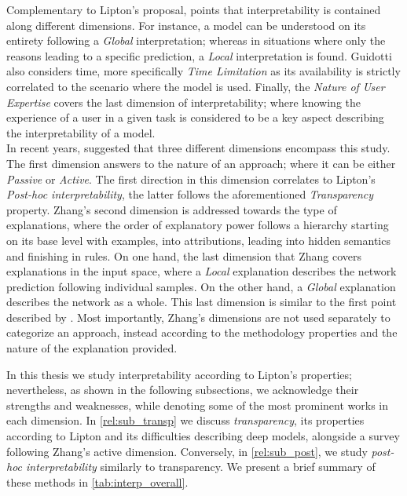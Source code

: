 \noindent Complementary to Lipton's proposal, \cite{guidotti2018survey} points that interpretability is 
contained along different dimensions. For instance, a model can be understood on its entirety 
following a \emph{Global} interpretation; whereas in situations where only the reasons leading to a 
specific prediction, a \emph{Local} interpretation is found. Guidotti also considers time,
more specifically \emph{Time Limitation} as its availability is strictly correlated to the scenario 
where the model is used. Finally, the \emph{Nature of User Expertise} covers the last dimension of 
interpretability; where knowing the experience of a user in a given task is considered to be a 
key aspect describing the interpretability of a model.\\

\noindent In recent years, \cite{zhang2021survey} suggested that three different dimensions 
encompass this study. The first dimension answers to the nature of an approach; where it can be 
either \emph{Passive} or \emph{Active}. The first direction in this dimension correlates to 
Lipton's \emph{Post-hoc interpretability}, the latter follows the aforementioned 
\emph{Transparency} property. Zhang's second dimension is addressed towards the type of 
explanations, where the order of explanatory power follows a hierarchy starting on its base level 
with examples, into attributions, leading into hidden semantics and finishing in rules. On one hand, 
the last dimension that Zhang covers explanations in the input space, where a \emph{Local} 
explanation describes the network  prediction following individual samples. On the other hand, a 
\emph{Global} explanation describes the network as a whole. This last dimension is similar to the 
first point described by \cite{guidotti2018survey}. Most importantly, Zhang's dimensions are not 
used separately to categorize an approach, instead according to the methodology properties and the 
nature of the explanation provided.

 
\noindent In this thesis we study interpretability according to Lipton's properties; nevertheless, as shown 
in the following subsections, we acknowledge their strengths and weaknesses, while denoting some of 
the most prominent works in each dimension. In \autoref{rel:sub_transp} we discuss 
\emph{transparency}, its properties according to Lipton and its difficulties describing deep models, 
alongside a survey following Zhang's active dimension. Conversely, in \autoref{rel:sub_post}, we 
study \emph{post-hoc interpretability} similarly to transparency. We present a brief summary of 
these methods in \autoref{tab:interp_overall}.

